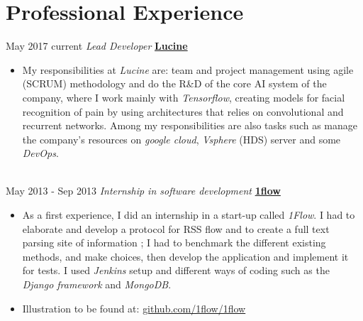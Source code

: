 \documentclass[letterpaper]{twentysecondcv} %
\begin{document}
\section{Professional Experience}

\begin{twenty} %

  \twentyitem
  {May 2017}
    {current}
        {\textit{Lead Developer}}
        {\href{http://www.projet-lucine.com/}{\textbf{Lucine}}}
        {}
        {
          {\begin{itemize}
            \item My responsibilities at \textit{Lucine} are: team and project management
              using agile (SCRUM) methodology and do the R\&D of the core AI
              system of the company, where I work mainly with \textit{Tensorflow},
              creating models for facial recognition of pain by using
              architectures that relies on convolutional and recurrent networks.
              Among my responsibilities are also tasks such as manage the
              company's resources on \textit{google cloud}, \textit{Vsphere} (HDS) server and some
              \textit{DevOps}.
          \end{itemize}}
        }
    \\


  \twentyitem
      {May 2013 -}
    {Sep 2013}
        {\textit{Internship in software development}}
        {\href{https://github.com/1flow/1flow}{\textbf{1flow}}}
        {}
        {
          {\begin{itemize}

            \item As a first experience, I did an internship in a start-up called \textit{1Flow}. I had to elaborate and develop a protocol for RSS flow and to create a full text parsing site of information ; I had to benchmark the different existing methods, and make choices, then develop the application and implement it for tests. I used \textit{Jenkins} setup and different ways of coding such as the \textit{Django framework} and \textit{MongoDB}.\\
        \item Illustration to be found at: \href{https://github.com/1flow/1flow}{github.com/1flow/1flow}
          \end{itemize}}
        }
    \\

\end{twenty}
\end{document}

